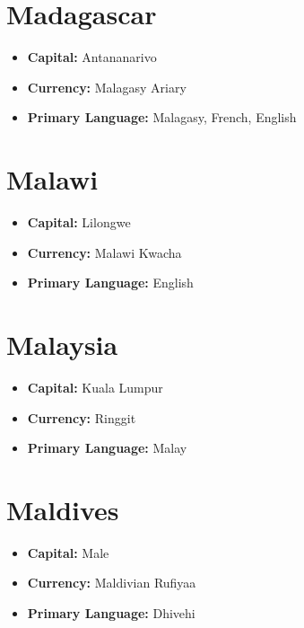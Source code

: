 \documentclass[a4paper,100pt,twoside]{book}
\begin{document}
\section*{\Huge Madagascar}
\vspace{5mm} %
\begin{itemize}
	\item \textbf{Capital:} Antananarivo
	\item \textbf{Currency:} Malagasy Ariary
	\item \textbf{Primary Language:} Malagasy, French, English
\end{itemize}

\section*{\Huge Malawi}
\vspace{5mm} %
\begin{itemize}
	\item \textbf{Capital:} Lilongwe
	\item \textbf{Currency:} Malawi Kwacha
	\item \textbf{Primary Language:} English
\end{itemize}

\section*{\Huge Malaysia}
\vspace{5mm} %
\begin{itemize}
	\item \textbf{Capital:} Kuala Lumpur
	\item \textbf{Currency:} Ringgit
	\item \textbf{Primary Language:} Malay
\end{itemize}

\section*{\Huge Maldives}
\vspace{5mm} %
\begin{itemize}
	\item \textbf{Capital:} Male
	\item \textbf{Currency:} Maldivian Rufiyaa
	\item \textbf{Primary Language:} Dhivehi
\end{itemize}
\end{document}
